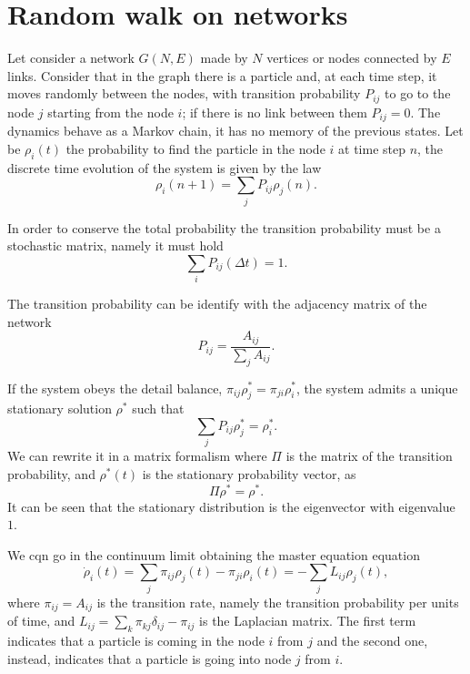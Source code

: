 \section{Random walk on networks}
Let consider a network $G(N,E)$ made by $N$ vertices or nodes connected by $E$ links.
Consider that in the graph there is a particle and, at each time step, it moves randomly between the nodes, with transition probability $P_{ij}$ to go to the node $j$ starting from the node $i$; if there is no link between them $P_{ij}= 0$. 
The dynamics behave as a Markov chain, it has no memory of the previous states. 
Let be $\rho_i (t)$ the probability to find the particle in the node $i$ at time step $n$, the discrete time evolution of the system is given by the law
\begin{equation}
    \rho_i(n+1) = \sum_j P_{ij}\rho_j(n).
\end{equation}

In order to conserve the total probability the transition probability must be a stochastic matrix, namely it must hold 
\begin{equation}
    \sum_i P_{ij}(\Delta t) = 1 .
\end{equation}

The transition probability  can be identify with the adjacency matrix of the network
\begin{equation}
    P_{ij} = \frac{A_{ij}}{\sum_j A_{ij}}.
\end{equation}

If the system obeys the detail balance, $\pi_{ij} \rho_j^* = \pi_{ji} \rho_i^*$, the system admits a unique stationary solution $\rho^*$ such that
\begin{equation}
    \sum_j P_{ij}\rho^*_j =  \rho^*_i .
\end{equation}
We can rewrite it in a matrix formalism where $\Pi$ is the matrix of the transition probability, and $\rho^*(t)$ is the stationary probability vector, as
\begin{equation}
    \Pi \rho^* = \rho^*.
\end{equation}
It can be seen that the stationary distribution is the eigenvector with eigenvalue $1$. 


We cqn go in the continuum limit obtaining the master equation equation \cite{Classic_random_walk}
\begin{equation}\label{master_eq}
    \dot \rho_i(t) = \sum_j \pi_{ij}\rho_j(t) - \pi_{ji}\rho_i(t) = - \sum_j L_{ij} \rho_j(t),
\end{equation}
where $\pi_{ij} = A_{ij}$ is the transition rate, namely the transition probability per units of time, and $L_{ij} = \sum_k \pi_{kj}\delta_{ij} -\pi_{ij} $ is the Laplacian matrix.
The first term indicates that a particle is coming in the node $i$ from $j$ and the second one, instead, indicates that a particle is going into node $j$ from $i$.

